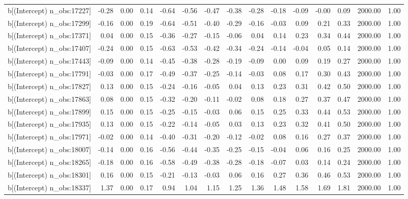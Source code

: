 \begin{table}[ht]
\begin{tabular}{rrrrrrrrrrrrrrr}
  b[(Intercept) n\_obs:17227] & -0.28 & 0.00 & 0.14 & -0.64 & -0.56 & -0.47 & -0.38 & -0.28 & -0.18 & -0.09 & -0.00 & 0.09 & 2000.00 & 1.00 \\ 
  b[(Intercept) n\_obs:17299] & -0.16 & 0.00 & 0.19 & -0.64 & -0.51 & -0.40 & -0.29 & -0.16 & -0.03 & 0.09 & 0.21 & 0.33 & 2000.00 & 1.00 \\ 
  b[(Intercept) n\_obs:17371] & 0.04 & 0.00 & 0.15 & -0.36 & -0.27 & -0.15 & -0.06 & 0.04 & 0.14 & 0.23 & 0.34 & 0.44 & 2000.00 & 1.00 \\ 
  b[(Intercept) n\_obs:17407] & -0.24 & 0.00 & 0.15 & -0.63 & -0.53 & -0.42 & -0.34 & -0.24 & -0.14 & -0.04 & 0.05 & 0.14 & 2000.00 & 1.00 \\ 
  b[(Intercept) n\_obs:17443] & -0.09 & 0.00 & 0.14 & -0.45 & -0.38 & -0.28 & -0.19 & -0.09 & 0.00 & 0.09 & 0.19 & 0.27 & 2000.00 & 1.00 \\ 
  b[(Intercept) n\_obs:17791] & -0.03 & 0.00 & 0.17 & -0.49 & -0.37 & -0.25 & -0.14 & -0.03 & 0.08 & 0.17 & 0.30 & 0.43 & 2000.00 & 1.00 \\ 
  b[(Intercept) n\_obs:17827] & 0.13 & 0.00 & 0.15 & -0.24 & -0.16 & -0.05 & 0.04 & 0.13 & 0.23 & 0.31 & 0.42 & 0.50 & 2000.00 & 1.00 \\ 
  b[(Intercept) n\_obs:17863] & 0.08 & 0.00 & 0.15 & -0.32 & -0.20 & -0.11 & -0.02 & 0.08 & 0.18 & 0.27 & 0.37 & 0.47 & 2000.00 & 1.00 \\ 
  b[(Intercept) n\_obs:17899] & 0.15 & 0.00 & 0.15 & -0.25 & -0.15 & -0.03 & 0.06 & 0.15 & 0.25 & 0.33 & 0.44 & 0.53 & 2000.00 & 1.00 \\ 
  b[(Intercept) n\_obs:17935] & 0.13 & 0.00 & 0.15 & -0.22 & -0.14 & -0.05 & 0.03 & 0.13 & 0.23 & 0.32 & 0.41 & 0.50 & 2000.00 & 1.00 \\ 
  b[(Intercept) n\_obs:17971] & -0.02 & 0.00 & 0.14 & -0.40 & -0.31 & -0.20 & -0.12 & -0.02 & 0.08 & 0.16 & 0.27 & 0.37 & 2000.00 & 1.00 \\ 
  b[(Intercept) n\_obs:18007] & -0.14 & 0.00 & 0.16 & -0.56 & -0.44 & -0.35 & -0.25 & -0.15 & -0.04 & 0.06 & 0.16 & 0.25 & 2000.00 & 1.00 \\ 
  b[(Intercept) n\_obs:18265] & -0.18 & 0.00 & 0.16 & -0.58 & -0.49 & -0.38 & -0.28 & -0.18 & -0.07 & 0.03 & 0.14 & 0.24 & 2000.00 & 1.00 \\ 
  b[(Intercept) n\_obs:18301] & 0.16 & 0.00 & 0.15 & -0.21 & -0.13 & -0.03 & 0.06 & 0.16 & 0.27 & 0.36 & 0.46 & 0.53 & 2000.00 & 1.00 \\ 
  b[(Intercept) n\_obs:18337] & 1.37 & 0.00 & 0.17 & 0.94 & 1.04 & 1.15 & 1.25 & 1.36 & 1.48 & 1.58 & 1.69 & 1.81 & 2000.00 & 1.00 \\ 

\end{tabular}
\end{table}
